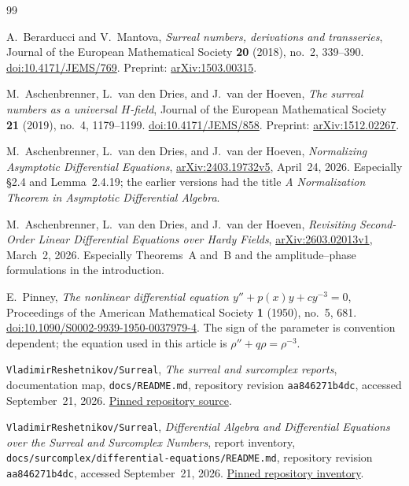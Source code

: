 \documentclass[11pt,a4paper]{article}
\numberwithin{equation}{section}
\theoremstyle{definition}
\theoremstyle{remark}
\begin{document}
\begingroup\small\raggedright
\begin{thebibliography}{99}
\setlength{\itemsep}{.25em}

A.~Berarducci and V.~Mantova,
\emph{Surreal numbers, derivations and transseries},
Journal of the European Mathematical Society \textbf{20} (2018),
no.~2, 339--390.
\href{https://doi.org/10.4171/JEMS/769}{doi:10.4171/JEMS/769}.
Preprint: \href{https://arxiv.org/abs/1503.00315}{arXiv:1503.00315}.

M.~Aschenbrenner, L.~van den Dries, and J.~van der Hoeven,
\emph{The surreal numbers as a universal $H$-field},
Journal of the European Mathematical Society \textbf{21} (2019),
no.~4, 1179--1199.
\href{https://doi.org/10.4171/JEMS/858}{doi:10.4171/JEMS/858}.
Preprint: \href{https://arxiv.org/abs/1512.02267}{arXiv:1512.02267}.

M.~Aschenbrenner, L.~van den Dries, and J.~van der Hoeven,
\emph{Normalizing Asymptotic Differential Equations},
\href{https://arxiv.org/abs/2403.19732v5}{arXiv:2403.19732v5},
April~24, 2026.
Especially \S2.4 and Lemma~2.4.19; the earlier versions had the title
\emph{A Normalization Theorem in Asymptotic Differential Algebra}.

M.~Aschenbrenner, L.~van den Dries, and J.~van der Hoeven,
\emph{Revisiting Second-Order Linear Differential Equations over Hardy Fields},
\href{https://arxiv.org/abs/2603.02013v1}{arXiv:2603.02013v1},
March~2, 2026. Especially Theorems~A and~B and the amplitude--phase
formulations in the introduction.

E.~Pinney,
\emph{The nonlinear differential equation $y''+p(x)y+cy^{-3}=0$},
Proceedings of the American Mathematical Society \textbf{1} (1950),
no.~5, 681.
\href{https://doi.org/10.1090/S0002-9939-1950-0037979-4}
{doi:10.1090/S0002-9939-1950-0037979-4}.
The sign of the parameter is convention dependent; the equation used
in this article is $\rho''+q\rho=\rho^{-3}$.

\texttt{VladimirReshetnikov/Surreal},
\emph{The surreal and surcomplex reports}, documentation map,
\texttt{docs/README.md}, repository revision \texttt{aa846271b4dc},
accessed September~21, 2026.
\href{https://github.com/VladimirReshetnikov/Surreal/blob/aa846271b4dcae2c055b216126a87210292ec19b/docs/README.md}
{Pinned repository source}.

\texttt{VladimirReshetnikov/Surreal},
\emph{Differential Algebra and Differential Equations over the Surreal
and Surcomplex Numbers}, report inventory,
\texttt{docs/surcomplex/differential-equations/README.md},
repository revision \texttt{aa846271b4dc}, accessed September~21, 2026.
\href{https://github.com/VladimirReshetnikov/Surreal/blob/aa846271b4dcae2c055b216126a87210292ec19b/docs/surcomplex/differential-equations/README.md}
{Pinned repository inventory}.


\end{thebibliography}
\end{document}
